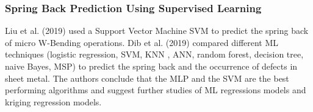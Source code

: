 \subsubsection*{Spring Back Prediction Using Supervised Learning}
Liu et al. (2019) used a Support Vector Machine \ac{SVM} to predict the spring back of
micro
W-Bending operations. \cite{liu_springbackpredictionforming_2019}
Dib et al. (2019) compared different \ac{ML} techniques (logistic regression, SVM, KNN
, ANN,
random forest, decision tree, naive Bayes, MSP) to predict the spring back and the
occurrence of
defects in sheet metal. \cite[p. 1]{dib_singleensembleclassifiers_2020}
The authors conclude that the MLP and the SVM are the best performing algorithms and
suggest
further studies of ML regressions models and kriging regression models. \cite[p.
13]{dib_singleensembleclassifiers_2020}

